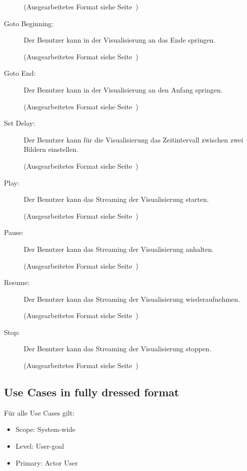 \begin{description}
  (Ausgearbeitetes Format siehe Seite~\pageref{uc:Backward})

  \item[Goto Beginning:] Der Benutzer kann in der Visualisierung an das Ende springen.

  (Ausgearbeitetes Format siehe Seite~\pageref{uc:Goto Beginning})

  \item[Goto End:] Der Benutzer kann in der Visualisierung an den Anfang springen.

  (Ausgearbeitetes Format siehe Seite~\pageref{uc:Goto End})

  \item[Set Delay:] Der Benutzer kann f\"ur die Visualisierung das Zeitintervall zwischen zwei Bildern einstellen.

  (Ausgearbeitetes Format siehe Seite~\pageref{uc:Set Delay})

  \item[Play:] Der Benutzer kann das Streaming der Visualisierung starten.

  (Ausgearbeitetes Format siehe Seite~\pageref{uc:Play})

  \item[Pause:] Der Benutzer kann das Streaming der Visualisierung anhalten.

  (Ausgearbeitetes Format siehe Seite~\pageref{uc:Pause})

  \item[Resume:] Der Benutzer kann das Streaming der Visualisierung wiederaufnehmen.

  (Ausgearbeitetes Format siehe Seite~\pageref{uc:Resume})

  \item[Stop:] Der Benutzer kann das Streaming der Visualisierung stoppen.

  (Ausgearbeitetes Format siehe Seite~\pageref{uc:Stop})
\end{description}

\newpage
\subsection{Use Cases in fully dressed format}
\label{subsec:uc_in_fully_dressed_format}
F\"ur alle Use Cases gilt:
\begin{itemize}
  \item Scope: System-wide
  \item Level: User-goal
  \item Primary: Actor User
\end{itemize}
% 
